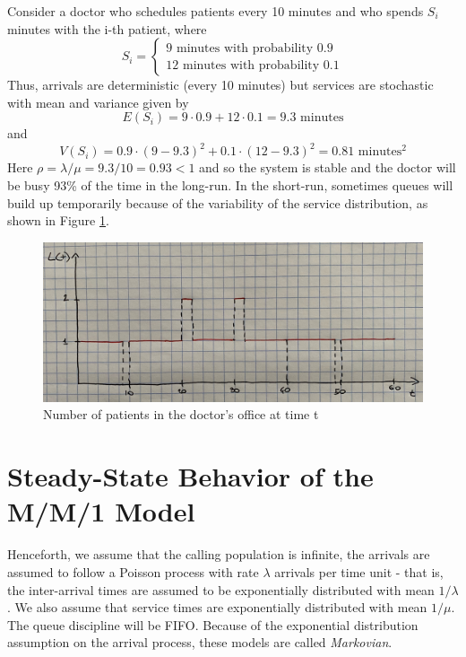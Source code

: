 \documentclass[
]{book}
\begin{document}
Consider a doctor who schedules patients every 10 minutes and who spends \(S_i\) minutes with the i-th patient, where
\[
S_i = \left\{
\begin{array}{l}
9 \mbox{ minutes with probability } 0.9\\
12 \mbox{ minutes with probability } 0.1
\end{array}
\right.
\]
Thus, arrivals are deterministic (every 10 minutes) but services are stochastic with mean and variance given by
\[
E(S_i)= 9\cdot 0.9 + 12\cdot 0.1 = 9.3 \mbox{ minutes}
\]
and
\[
V(S_i)=0.9\cdot(9-9.3)^2 + 0.1\cdot(12-9.3)^2 = 0.81 \mbox{ minutes}^2
\]
Here \(\rho=\lambda /\mu = 9.3/10=0.93 < 1\) and so the system is stable and the doctor will be busy 93\% of the time in the long-run. In the short-run, sometimes queues will build up temporarily because of the variability of the service distribution, as shown in Figure \ref{fig:system4}.

\begin{figure}

{\centering \includegraphics[width=0.9\linewidth]{images/system4} 

}

\caption{Number of patients in the doctor's office at time t}\label{fig:system4}
\end{figure}

\hypertarget{steady-state-behavior-of-the-mm1-model}{%
\section{Steady-State Behavior of the M/M/1 Model}\label{steady-state-behavior-of-the-mm1-model}}

Henceforth, we assume that the calling population is infinite, the arrivals are assumed to follow a Poisson process with rate \(\lambda\) arrivals per time unit - that is, the inter-arrival times are assumed to be exponentially distributed with mean \(1/\lambda\). We also assume that service times are exponentially distributed with mean \(1/\mu\). The queue discipline will be FIFO. Because of the exponential distribution assumption on the arrival process, these models are called \emph{Markovian}.
\end{document}
